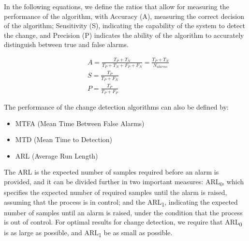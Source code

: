 \par In the following equations, we define the ratios that allow for measuring the performance of the algorithm, with Accuracy (A), measuring the correct decision
of the algorithm; Sensitivity (S), indicating the capability of the system to detect the change, and Precision (P) indicates the ability of the algorithm to
accurately distinguish between true and false alarms. 

\begin{equation*}
\begin{split}
    &A    =  \frac {T_P + T_N} {T_P + T_N + F_P + F_N} = \frac {T_P + T_N} {N_{alarms}}   \\
    &S    =  \frac {T_P} {T_P + F_N} \\
    &P    =  \frac {T_P} {T_P + F_P}
\end{split}
\end{equation*}

The performance of the change detection algorithms can also be defined by:

\begin{itemize}
    \item MTFA (Mean Time Between False Alarms) 
    \item MTD (Mean Time to Detection)
    \item ARL (Average Run Length)
\end{itemize}


\par The ARL is the expected number of samples required before an alarm is provided, and it can be divided further in two important measures: ARL\textsubscript{0},
which specifies the expected number of required samples until the alarm is raised, assuming that the process is in control; and the ARL\textsubscript{1}, indicating
the expected number of samples until an alarm is raised, under the condition that the process is out of control. For optimal results for change detection, we require
that ARL\textsubscript{0} is as large as possible, and ARL\textsubscript{1} be as small as possible.
